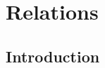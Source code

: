 







































































\newpage



\chapter{Relations}

\section{Introduction}

